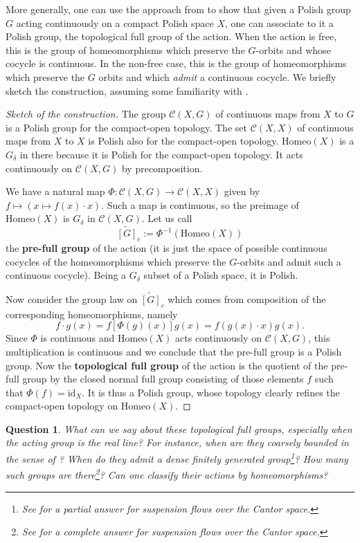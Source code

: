 \documentclass{article}
\newtheorem{question}[theorem]{Question}
\theoremstyle{definition}
\begin{document}
More generally, one can use the approach from \cite{carderiMorePolishfull2016} to show that given a Polish group $G$ acting continuously on a compact Polish space $X$, one can associate to it a Polish group, the topological full group of the action. When the action is free, this is the group of homeomorphisms which preserve the $G$-orbits and whose cocycle is continuous. In the non-free case, this is the group of homeomorphisms which preserve the $G$ orbits and which \emph{admit} a continuous cocycle. We briefly sketch the construction, assuming some familiarity with \cite[Sec.~3.2]{carderiMorePolishfull2016}.

\begin{proof}[Sketch of the construction]
	The group $\mathcal C(X,G)$ of continuous maps from $X$ to $G$ is a Polish group for the compact-open topology. The set $\mathcal C(X,X)$ of continuous maps from $X$ to $X$ is Polish also for the compact-open topology. $ \mathrm{Homeo}(X)$ is a $G_\delta$ in there because it is Polish for the compact-open topology. It acts continuously on $\mathcal C(X,G)$ by precomposition.
	
	We have a natural map $\Phi:\mathcal C(X,G)\to \mathcal C(X,X)$ given by $f\mapsto (x\mapsto f(x)\cdot x)$. Such a map is continuous, so the preimage of $ \mathrm{Homeo}(X)$ is $G_\delta$ in $\mathcal C(X,G)$. Let us call 
	$$\widetilde{[G]}_c:=\Phi^{-1}( \mathrm{Homeo}(X))$$
	the \textbf{pre-full group} of the action (it is just the space of possible continuous cocycles of the homeomorphisms which preserve the $G$-orbits and admit such a continuous cocycle). Being a $G_\delta$ subset of a Polish space, it is Polish.
	
	
	Now  consider the group law on $\widetilde{[G]}_c$ which comes from composition of the corresponding homeomorphisms, namely 
	$$f\cdot g(x)=f[\Phi(g)(x)]g(x)=f(g(x)\cdot x)g(x).$$
	Since $\Phi$ is continuous and $ \mathrm{Homeo}(X)$ acts continuously on $\mathcal C(X,G)$, this multiplication is continuous and we conclude that the pre-full group is a Polish group. Now the \textbf{topological full group} of the action is the quotient of the pre-full group by the closed normal full group consisting of those elements $f$ such that $\Phi(f)=\mathrm{id}_X$. It is thus a Polish group, whose topology clearly refines the compact-open topology on $ \mathrm{Homeo}(X)$.
\end{proof}

\begin{question}
	What can we say about these topological full groups, especially when the acting group is the real line? For instance, when are they coarsely bounded in the sense of \cite{rosendalTopologicalVersionBergman2009}? When do they admit a dense finitely generated group\footnote{See \cite[Thm. A]{mattebonGroupsPiecewiseLinear2020} for a partial answer for suspension flows over the Cantor space.}?  How many such groups are there\footnote{See \cite[Sec.~10]{mattebonGroupsPiecewiseLinear2020} for a complete answer for suspension flows over the Cantor space.}? Can one classify their actions by homeomorphisms?
\end{question}
\end{document}
